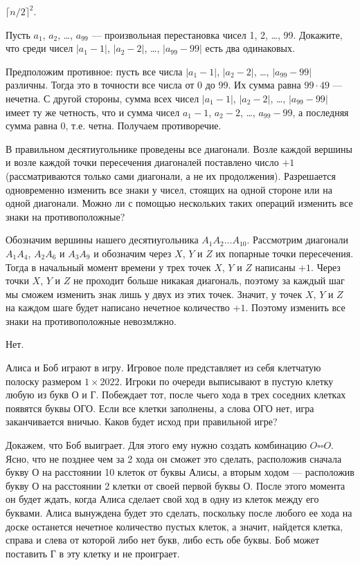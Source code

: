 \begin{problems}
 $\lceil n/2\rceil^2$.

\item Пусть $a_1$, $a_2$, \ldots, $a_{99}$ --- произвольная перестановка чисел 1, 2, \ldots, 99. Докажите, что среди чисел $|a_1-1|$, $|a_2-2|$, \ldots, $|a_{99}-99|$ есть два одинаковых.

 Предположим противное: пусть все числа $|a_1-1|$, $|a_2-2|$, \ldots, $|a_{99}-99|$ различны. Тогда это в точности все числа от 0 до 99. Их сумма равна $99\cdot 49$ --- нечетна. С другой стороны, сумма всех чисел $|a_1-1|$, $|a_2-2|$, \ldots, $|a_{99}-99|$ имеет ту же четность, что и сумма чисел $a_1-1$, $a_2-2$, \ldots, $a_{99}-99$, а последняя сумма равна 0, т.е. четна. Получаем противоречие.

\item В правильном десятиугольнике проведены все диагонали. Возле каждой вершины и возле каждой точки пересечения диагоналей поставлено число $+1$ (рассматриваются только сами диагонали, а не их продолжения). Разрешается одновременно изменить все знаки у чисел, стоящих на одной стороне или на одной диагонали. Можно ли с помощью нескольких таких операций изменить все знаки на противоположные?

 Обозначим вершины нашего десятиугольника $A_1A_2\ldots A_{10}$. Рассмотрим диагонали $A_1A_4$, $A_2A_6$ и $A_3A_9$ и обозначим через $X$, $Y$ и $Z$ их попарные точки пересечения. Тогда в начальный момент времени у трех точек $X$, $Y$ и $Z$ написаны $+1$. Через точки $X$, $Y$ и $Z$ не проходит больше никакая диагональ, поэтому за каждый шаг мы сможем изменить знак лишь у двух из этих точек. Значит, у точек $X$, $Y$ и $Z$ на каждом шаге будет написано нечетное количество $+1$. Поэтому изменить все знаки на противоположные невозмлжно.

 Нет.

\item Алиса и Боб играют в игру. Игровое поле представляет из себя клетчатую полоску размером $1\times 2022$. Игроки по очереди выписывают в пустую клетку любую из букв О и Г. Побеждает тот, после чьего хода в трех соседних клетках появятся буквы ОГО. Если все клетки заполнены, а слова ОГО нет, игра заканчивается вничью. Каков будет исход при правильной игре? 

 Докажем, что Боб выиграет. Для этого ему нужно создать комбинацию $O\square\square O$. Ясно, что не позднее чем за 2 хода он сможет это сделать, расположив сначала букву О на расстоянии 10 клеток от буквы Алисы, а вторым ходом --- расположив букву О на расстоянии 2 клетки от своей первой буквы О. После этого момента он будет ждать, когда Алиса сделает свой ход в одну из клеток между его буквами. Алиса вынуждена будет это сделать, поскольку после любого ее хода на доске останется нечетное количество пустых клеток, а значит, найдется клетка, справа и слева от которой либо нет букв, либо есть обе буквы. Боб может поставить Г в эту клетку и не проиграет.


\end{problems}
